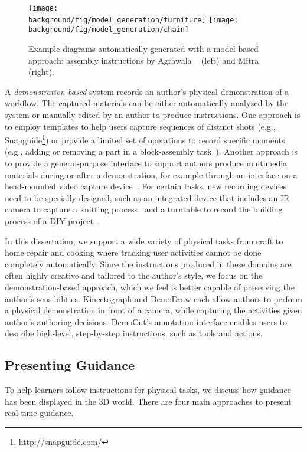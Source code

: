 \begin{figure*}[b!]
  \centering
  \texttt{[image: \\background/fig/model\_generation/furniture]}
  \texttt{[image: \\background/fig/model\_generation/chain]}
  \caption{Example diagrams automatically generated with a model-based approach: assembly instructions by Agrawala \ea~\cite{agrawala2003designing} (left) and Mitra \ea~\cite{mitra2010illustrating} (right).}
  \label{fig:related_models}
\end{figure*}

A \emph{demonstration-based} system records an author's physical demonstration of a workflow. The captured materials can be either automatically analyzed by the system or manually edited by an author to produce instructions.
%
One approach is to employ templates to help users capture sequences of distinct shots (e.g., Snapguide\footnote{\url{http://snapguide.com/}}) or provide a limited set of operations to record specific moments (e.g., adding or removing a part in a block-assembly task~\cite{Ranjan:2007,Gupta2012DuploTrack}).
%
Another approach is to provide a general-purpose interface to support authors produce multimedia materials during or after a demonstration, for example through an interface on a head-mounted video capture device~\cite{carter2015authoring}. For certain tasks, new recording devices need to be specially designed, such as an integrated device that includes an IR camera to capture a knitting process~\cite{Rosner:2008:SAK:1409635.1409682} and a turntable to record the building process of a DIY project~\cite{Tseng:2015:SPT:2771839.2771869}.

In this dissertation, we support a wide variety of physical tasks from craft to home repair and cooking where tracking user activities cannot be done completely automatically. Since the instructions produced in these domains are often highly creative and tailored to the author's style, we focus on the demonstration-based approach, which we feel is better capable of preserving the author's sensibilities.
%
Kinectograph and DemoDraw each allow authors to perform a physical demonstration in front of a camera, while capturing the activities given author's authoring decisions. DemoCut's annotation interface enables users to describe high-level, step-by-step instructions, such as tools and actions.


\subsection{Presenting Guidance}
To help learners follow instructions for physical tasks, we discuss how guidance has been displayed in the 3D world. There are four main approaches to present real-time guidance.

